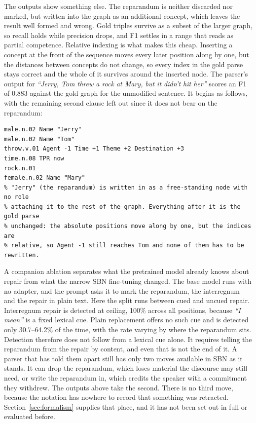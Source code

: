 \documentclass{article}
\begin{document}
The outputs show something else. The reparandum is neither discarded nor marked,
but written into the graph as an additional concept, which leaves the result well
formed and wrong. Gold triples survive as a subset of the larger graph, so recall
holds while precision drops, and F1 settles in a range that reads as partial
competence. Relative indexing is what makes this cheap. Inserting a concept at
the front of the sequence moves every later position along by one, but the
distances between concepts do not change, so every index in the gold parse stays
correct and the whole of it survives around the inserted node. The parser's output for \textit{``Jerry, Tom threw a rock at Mary, but it
didn't hit her''} scores an F1 of 0.883 against the gold graph for the
unmodified sentence. It begins as follows, with the remaining second clause
left out since it does not bear on the reparandum:

\begin{lstlisting}[style=sbn]
male.n.02 Name "Jerry"
male.n.02 Name "Tom"
throw.v.01 Agent -1 Time +1 Theme +2 Destination +3
time.n.08 TPR now
rock.n.01
female.n.02 Name "Mary"
% "Jerry" (the reparandum) is written in as a free-standing node with no role
% attaching it to the rest of the graph. Everything after it is the gold parse
% unchanged: the absolute positions move along by one, but the indices are
% relative, so Agent -1 still reaches Tom and none of them has to be rewritten.
\end{lstlisting}

A companion ablation separates what the pretrained model already knows about
repair from what the narrow SBN fine-tuning changed. The base model runs with no
adapter, and the prompt asks it to mark the reparandum, the interregnum and the
repair in plain text. Here the split runs between cued and uncued repair.
Interregnum repair is detected at ceiling, 100\% across all
positions, because \textit{``I mean''} is a fixed lexical cue. Plain
replacement offers no such cue and is detected only 30.7--64.2\% of the time,
with the rate varying by where the reparandum sits. Detection therefore does not follow from a lexical cue alone.
It requires telling the reparandum from the repair by content, and even that is not the end of it. A
parser that has told them apart still has only two moves available in SBN as it
stands. It can drop the reparandum, which loses material the discourse may still
need, or write the reparandum in, which credits the speaker with a commitment they
withdrew. The outputs above take the second. There is no third move, because the
notation has nowhere to record that something was retracted.
Section~\ref{sec:formalism} supplies that place, and it has not been set out in
full or evaluated before.
\end{document}
